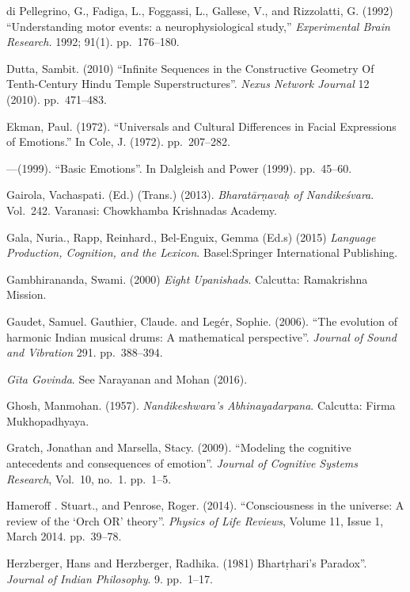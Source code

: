 \begin{thebibliography}{99}
di Pellegrino, G., Fadiga, L., Foggassi, L., Gallese, V., and Rizzolatti, G. (1992) “Understanding motor events: a neurophysiological study,” \textsl{Experimental Brain Research.} 1992; 91(1). pp.~176--180.

Dutta, Sambit. (2010) “Infinite Sequences in the Constructive Geometry Of Tenth-Century Hindu Temple  Superstructures”. \textsl{Nexus Network Journal} 12 (2010). pp.~471--483.

Ekman, Paul. (1972). ``Universals and Cultural Differences in Facial Expressions of Emotions.'' In Cole, J. (1972). pp.~207--282.

---\kern3pt(1999). ``Basic Emotions''. In Dalgleish and Power (1999). pp.~45--60.


Gairola, Vachaspati. (Ed.) (Trans.) (2013). \textsl{Bharatārṇavaḥ of Nandikeśvara}. Vol.~242. Varanasi: Chowkhamba Krishnadas Academy.

Gala, Nuria., Rapp, Reinhard., Bel-Enguix, Gemma (Ed.s) (2015) \textsl{Language Production, Cognition, and the Lexicon}. Basel:Springer International Publishing.

Gambhirananda, Swami. (2000) \textsl{Eight Upanishads}. Calcutta: Ramakrishna Mission.

Gaudet, Samuel. Gauthier, Claude. and Legér, Sophie. (2006). “The evolution of harmonic Indian musical drums: A mathematical perspective”. \textsl{Journal of Sound and Vibration} 291. pp.~388--394.

\textsl{Gīta Govinda}. See Narayanan and Mohan (2016).

Ghosh, Manmohan. (1957). \textsl{Nandikeshwara’s Abhinayadarpana}. Calcutta: Firma Mukhopadhyaya.

Gratch, Jonathan and Marsella, Stacy. (2009). ``Modeling the cognitive antecedents and consequences of emotion”. \textsl{Journal of Cognitive Systems Research}, Vol.~10, no.~1. pp.~1--5.

Hameroff . Stuart., and Penrose, Roger. (2014). “Consciousness in the universe: A review of the ‘Orch OR’ theory”. \textsl{Physics of Life Reviews}, Volume 11, Issue 1, March 2014. pp.~39--78.

Herzberger, Hans and Herzberger, Radhika. (1981) Bhartṛhari's Paradox”. \textsl{Journal of Indian Philosophy}. 9. pp.~1--17.


\end{thebibliography}

